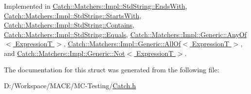 Implemented in \hyperlink{struct_catch_1_1_matchers_1_1_impl_1_1_std_string_1_1_ends_with_a54715c94c215a1fc5fb6336acf52eb06}{Catch\+::\+Matchers\+::\+Impl\+::\+Std\+String\+::\+Ends\+With}, \hyperlink{struct_catch_1_1_matchers_1_1_impl_1_1_std_string_1_1_starts_with_a066fe10e74495cb556abc6895193ba97}{Catch\+::\+Matchers\+::\+Impl\+::\+Std\+String\+::\+Starts\+With}, \hyperlink{struct_catch_1_1_matchers_1_1_impl_1_1_std_string_1_1_contains_a226755351f3598179925f3ab89d6def7}{Catch\+::\+Matchers\+::\+Impl\+::\+Std\+String\+::\+Contains}, \hyperlink{struct_catch_1_1_matchers_1_1_impl_1_1_std_string_1_1_equals_a7a09449ff2f858981caf3b1f6c36d270}{Catch\+::\+Matchers\+::\+Impl\+::\+Std\+String\+::\+Equals}, \hyperlink{class_catch_1_1_matchers_1_1_impl_1_1_generic_1_1_any_of_a7ecc6ec08b2018a643923a9d450aa328}{Catch\+::\+Matchers\+::\+Impl\+::\+Generic\+::\+Any\+Of$<$ Expression\+T $>$}, \hyperlink{class_catch_1_1_matchers_1_1_impl_1_1_generic_1_1_all_of_a9febc1e67acbeff62a32bcbfdc0c8fab}{Catch\+::\+Matchers\+::\+Impl\+::\+Generic\+::\+All\+Of$<$ Expression\+T $>$}, and \hyperlink{class_catch_1_1_matchers_1_1_impl_1_1_generic_1_1_not_ab970a4a6e58a987451e0b0e0e60a0bff}{Catch\+::\+Matchers\+::\+Impl\+::\+Generic\+::\+Not$<$ Expression\+T $>$}.



The documentation for this struct was generated from the following file\+:\begin{DoxyCompactItemize}
\item 
D\+:/\+Workspace/\+M\+A\+C\+E/\+M\+C-\/\+Testing/\hyperlink{_catch_8h}{Catch.\+h}\end{DoxyCompactItemize}
